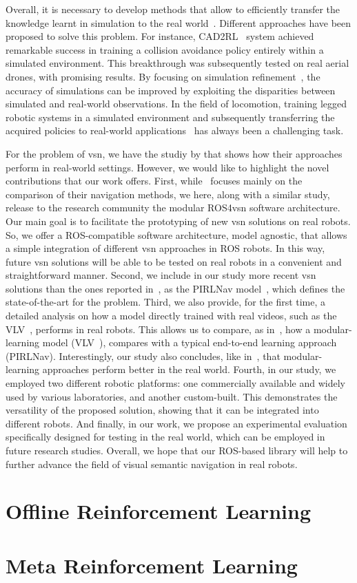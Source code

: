 Overall, it is necessary to develop methods that allow to efficiently transfer the knowledge learnt in simulation to the real world~\cite{kadian2020}.
Different approaches have been proposed to solve this problem.
For instance, CAD2RL~\cite{sadeghiCAD2RLRealSingleImage2017} system achieved remarkable success in training a collision avoidance policy entirely within a simulated environment.
This breakthrough was subsequently tested on real aerial drones, with promising results.
By focusing on simulation refinement~\cite{Son2020}, the accuracy of simulations can be improved by exploiting the disparities between simulated and real-world observations.
In the field of locomotion, training legged robotic systems in a simulated environment and subsequently transferring the acquired policies to real-world applications~\cite{Hwangbo_2019, agarwal2022} has always been a challenging task.

For the problem of \acrshort{vsn}, we have the studiy by \cite{gervet2022} that shows how their approaches perform in real-world settings.
However, we would like to highlight the novel contributions that our work offers.
First, while~\cite{gervet2022} focuses mainly on the comparison of their navigation methods, we here, along with a similar study, release to the research community the modular ROS4\acrshort{vsn} software architecture.
Our main goal is to facilitate the prototyping of new \acrshort{vsn} solutions on real robots.
So, we offer a ROS-compatible software architecture, model agnostic, that allows a simple integration of different \acrshort{vsn} approaches in ROS robots.
In this way, future \acrshort{vsn} solutions will be able to be tested on real robots in a convenient and straightforward manner.
Second, we include in our study more recent \acrshort{vsn} solutions than the ones reported in~\cite{gervet2022}, as the PIRLNav model~\cite{ramrakhya2023}, which defines the state-of-the-art for the \objnav problem.
Third, we also provide, for the first time, a detailed analysis on how a model directly trained with real videos, such as the VLV~\cite{chang2020}, performs in real robots.
This allows us to compare, as in~\cite{gervet2022}, how a modular-learning model (\ie VLV~\cite{chang2020}), compares with a typical end-to-end learning approach (\ie PIRLNav).
Interestingly, our study also concludes, like in~\cite{gervet2022}, that modular-learning approaches perform better in the real world.
Fourth, in our study, we employed two different robotic platforms: one commercially available and widely used by various laboratories, and another custom-built.
This demonstrates the versatility of the proposed solution, showing that it can be integrated into different robots.
And finally, in our work, we propose an experimental evaluation specifically designed for testing in the real world, which can be employed in future research studies.
Overall, we hope that our ROS-based library will help to further advance the field of visual semantic navigation in real robots.

\section{Offline Reinforcement Learning}\label{sec:offline-reinforcement-learning}

\section{Meta Reinforcement Learning}\label{sec:meta-reinforcement-learning}